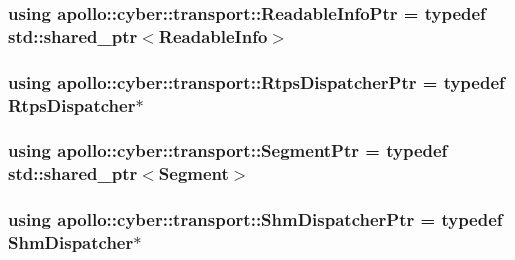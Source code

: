 \hypertarget{namespaceapollo_1_1cyber_1_1transport_a05661242213cefca12ed465da1e95baf}{
\subsubsection[{Readable\-Info\-Ptr}]{\setlength{\rightskip}{0pt plus 5cm}using {\bf apollo\-::cyber\-::transport\-::\-Readable\-Info\-Ptr} = typedef std\-::shared\-\_\-ptr$<${\bf Readable\-Info}$>$}}\label{namespaceapollo_1_1cyber_1_1transport_a05661242213cefca12ed465da1e95baf}
\hypertarget{namespaceapollo_1_1cyber_1_1transport_a52a5f048384d7613248f6b93957ca0be}{
\subsubsection[{Rtps\-Dispatcher\-Ptr}]{\setlength{\rightskip}{0pt plus 5cm}using {\bf apollo\-::cyber\-::transport\-::\-Rtps\-Dispatcher\-Ptr} = typedef {\bf Rtps\-Dispatcher}$\ast$}}\label{namespaceapollo_1_1cyber_1_1transport_a52a5f048384d7613248f6b93957ca0be}
\hypertarget{namespaceapollo_1_1cyber_1_1transport_ae92e21f5ec6b011ba398cd6907465406}{
\subsubsection[{Segment\-Ptr}]{\setlength{\rightskip}{0pt plus 5cm}using {\bf apollo\-::cyber\-::transport\-::\-Segment\-Ptr} = typedef std\-::shared\-\_\-ptr$<${\bf Segment}$>$}}\label{namespaceapollo_1_1cyber_1_1transport_ae92e21f5ec6b011ba398cd6907465406}
\hypertarget{namespaceapollo_1_1cyber_1_1transport_ad2181d36e971d8b74b322f8e2e3b36de}{
\subsubsection[{Shm\-Dispatcher\-Ptr}]{\setlength{\rightskip}{0pt plus 5cm}using {\bf apollo\-::cyber\-::transport\-::\-Shm\-Dispatcher\-Ptr} = typedef {\bf Shm\-Dispatcher}$\ast$}}\label{namespaceapollo_1_1cyber_1_1transport_ad2181d36e971d8b74b322f8e2e3b36de}
